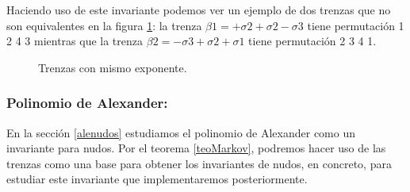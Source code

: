 \documentclass[14pt]{extarticle}
\begin{document}
Haciendo uso de este invariante podemos ver un ejemplo de dos trenzas que no son equivalentes en la figura \ref{perm2}: la trenza $\beta1 = +\sigma2+\sigma2-\sigma3$ tiene permutación 1 2 4 3 mientras que la trenza $\beta2 = -\sigma3+\sigma2+\sigma1$ tiene permutación 2 3 4 1.\\ 
	\begin{figure}[h!]
		\centering
		\caption{Trenzas con mismo exponente.}
		\label{perm2} 
	\end{figure}


\bigskip
\subsubsection{Polinomio de Alexander:}\label{invtren3}
En la sección \ref{alenudos} estudiamos el polinomio de Alexander como un invariante para nudos. Por el teorema \ref{teoMarkov}, podremos hacer uso de las trenzas como una base para obtener los invariantes de nudos, en concreto, para estudiar este invariante que implementaremos posteriormente. \\
\end{document}
